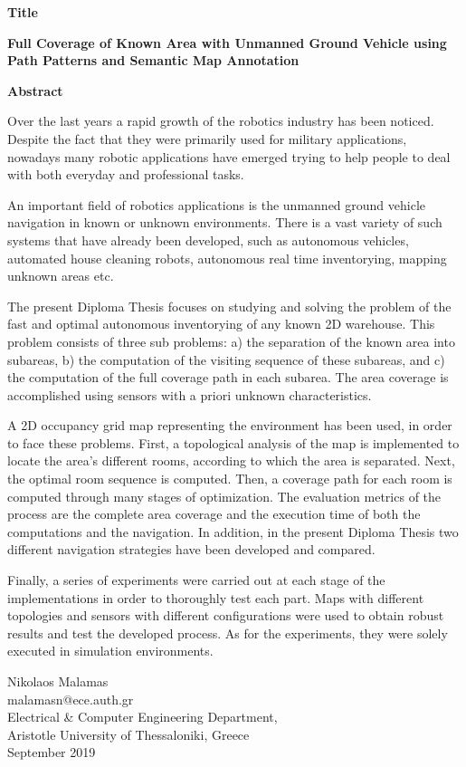 {\selectfont

{}


\begin{center}
  \centering
  \textbf{\Large{Title}}
  \vspace{0.5cm}

 
  \textbf{\large{Full Coverage of Known Area with Unmanned Ground Vehicle using Path Patterns and Semantic Map Annotation}}

  \vspace{1cm}

  \centering
  \textbf{Abstract}
\end{center}

Over the last years a rapid growth of the robotics industry has been noticed. Despite the fact that they were primarily used for military applications, nowadays many robotic applications have emerged trying to help people to deal with both everyday and professional tasks.

An important field of robotics applications is the unmanned ground vehicle navigation in known or unknown environments. There is a vast variety of such systems that have already been developed, such as autonomous vehicles, automated house cleaning robots, autonomous real time inventorying, mapping unknown areas etc.

The present Diploma Thesis focuses on studying and solving the problem of the fast and optimal autonomous inventorying of any known 2D warehouse. This problem consists of three sub problems: a) the separation of the known area into subareas, b) the computation of the visiting sequence of these subareas, and c) the computation of the full coverage path in each subarea. The area coverage is accomplished using sensors with a priori unknown characteristics. 

A 2D occupancy grid map representing the environment has been used, in order to face these problems. First, a topological analysis of the map is implemented to locate the area's different rooms, according to which the area is separated. Next, the optimal room sequence is computed. Then, a coverage path for each room is computed through many stages of optimization. The evaluation metrics of the process are the complete area coverage and the execution time of both the computations and the navigation. In addition, in the present Diploma Thesis two different navigation strategies have been developed and compared.

Finally, a series of experiments were carried out at each stage of the implementations in order to thoroughly test each part. Maps with different topologies and sensors with different configurations were used to obtain robust results and test the developed process. As for the experiments, they were solely executed in simulation environments.
 

\begin{flushright}
  \vspace{2cm}
  Nikolaos Malamas
  \\
  malamasn@ece.auth.gr
  \\
  Electrical \& Computer Engineering Department,
  \\
  Aristotle University of Thessaloniki, Greece
  \\
  September 2019
\end{flushright}

}
